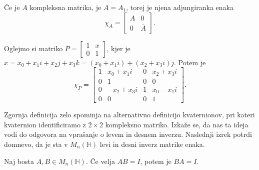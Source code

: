 \documentclass[mat1, tisk]{fmfdelo}
\numberwithin{equation}{section}
\begin{document}
\begin{opomba}
    Če je $A$ kompleksna matrika, je $A = A_{1}$, torej je njena adjungiranka enaka
    $$\chi_{A} =
    \begin{bmatrix}
        A & 0\\
        0 & \overline{A}
    \end{bmatrix}.
    $$
\end{opomba}

\begin{zgled}
    Oglejmo si matriko
    $
    P = 
    \begin{bmatrix}
        1 & x \\
        0 & 1
    \end{bmatrix}
    $,
    kjer je $x = x_{0} + x_{1}i + x_{2}j + x_{3}k = (x_{0} + x_{1}i) + (x_{2} + x_{3}i)j$. Potem je
    $$\chi_{P} = 
    \begin{bmatrix}
        1 & x_{0} + x_{1}i & 0 & x_{2} + x_{3}i\\
        0 & 1 & 0 & 0 \\
        0 & -x_{2} + x_{3}i & 1 & x_{0} - x_{1}i \\
        0 & 0 & 0 & 1
    \end{bmatrix}.
    $$
    
\end{zgled}

\noindent
Zgornja definicija zelo spominja na alternativno definicijo kvaternionov, pri kateri kvaternion identificiramo z $2\times 2$ 
kompleksno matriko. Izkaže se, da nas ta ideja vodi do odgovora na vprašanje o levem in desnem inverzu.
Naslednji izrek potrdi domnevo, da je sta v $M_{n}(\mathbb{H})$ levi in desni inverz matrike enaka.

\begin{izrek}\label{inverz}
    Naj bosta $A, B \in M_{n} (\mathbb{H})$. Če velja $AB = I$, potem je $BA = I$.
\end{izrek}
\end{document}
